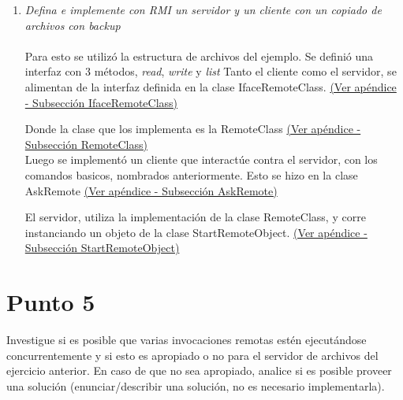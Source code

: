 \documentclass[12pt,journal,compsoc]{IEEEtran}
\begin{document}
\begin{enumerate}[label=\alph* -]
  \item \textit{Defina e implemente con RMI un servidor y un cliente con
  un copiado de archivos con backup}\\\\
  
  Para esto se utilizó la estructura de archivos del ejemplo. Se definió
  una interfaz con 3 métodos, \textit{read}, \textit{write} y
  \textit{list}
  Tanto el cliente como el servidor, se alimentan de la interfaz definida
  en la clase IfaceRemoteClass.
  \hyperref[section:IfaceRemoteClass]{(Ver apéndice - Subsección IfaceRemoteClass)}
  
  Donde la clase que los implementa es la RemoteClass
  \hyperref[section:RemoteClass]{(Ver apéndice - Subsección RemoteClass)}\\
  
  Luego se implementó un cliente que interactúe contra el servidor, con
  los comandos basicos, nombrados anteriormente. Esto se hizo en la clase
  AskRemote
  \hyperref[section:AskRemote]{(Ver apéndice - Subsección AskRemote)}

  El servidor, utiliza la implementación de la clase RemoteClass, y
  corre instanciando un objeto de la clase StartRemoteObject.
  \hyperref[section:StartRemoteObject]{(Ver apéndice - Subsección StartRemoteObject)}

\end{enumerate}

\section{Punto 5}

Investigue si es posible que varias invocaciones remotas estén
ejecutándose concurrentemente y si esto es apropiado o no para el
servidor de archivos del ejercicio anterior. En caso de que no sea 
apropiado, analice si es posible proveer una solución
(enunciar/describir una solución, no es necesario implementarla).
\end{document}
